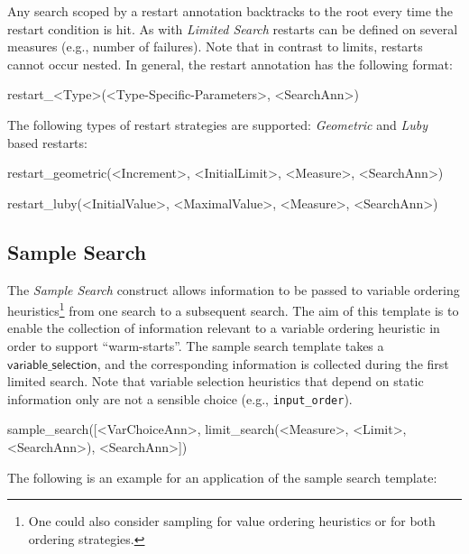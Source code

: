 \documentclass[a4paper]{article}
\newcommand{\fzsf}[1]{\ensuremath{\mathsf{#1}}}
\newcommand{\fzvarchoiceannotation}{\fzsf{variable\_selection}}
\newcommand{\vblabel}[1]	{\large\textbf{#1}}
\begin{document}
Any search scoped by a restart annotation backtracks to the root every time the
restart condition is hit.  As with \emph{Limited Search} restarts can be
defined on several measures (e.g., number of failures).  Note that in contrast
to limits, restarts cannot occur nested.  In general, the restart annotation
has the following format:

\begin{Zinc}[label={\vblabel{Restarting Search}}]
restart_<Type>(<Type-Specific-Parameters>, <SearchAnn>)
\end{Zinc}

The following types of restart strategies are supported:
\emph{Geometric} and \emph{Luby} based restarts:

\begin{Zinc}[label={\vblabel{Geometrically Restarting Search}}]
restart_geometric(<Increment>, <InitialLimit>, <Measure>, <SearchAnn>)
\end{Zinc}

\begin{Zinc}[label={\vblabel{Luby Restarting Search}}]
restart_luby(<InitialValue>, <MaximalValue>, <Measure>, <SearchAnn>)
\end{Zinc}


\subsection{Sample Search}

The \emph{Sample Search} construct allows information to be passed to
variable ordering heuristics\footnote{One could also consider sampling for
value ordering heuristics or for both ordering strategies.} from one search to
a subsequent search.  The aim of this template is to enable the collection of
information relevant to a variable ordering heuristic in order to support
``warm-starts''.  The sample search template takes a \fzvarchoiceannotation,
and the corresponding information is collected during the first limited search.
Note that variable selection heuristics that depend on static information only
are not a sensible choice (e.g., \texttt{input\_order}).

\begin{Zinc}[label={\vblabel{Sample Search}}]
sample_search([<VarChoiceAnn>, limit_search(<Measure>, <Limit>, <SearchAnn>), <SearchAnn>])
\end{Zinc}

The following is an example for an application of the sample search template:
\end{document}

